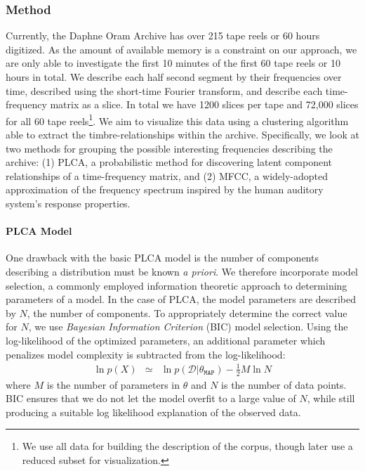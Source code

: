 \documentclass[a4paper,10pt,final]{ThesisStyle}
\begin{document}
\subsubsection{Method}

Currently, the Daphne Oram Archive has over 215 tape reels or 60 hours digitized.  As the amount of available memory is a constraint on our approach, we are only able to investigate the first 10 minutes of the first 60 tape reels or 10 hours in total.  We describe each half second segment by their frequencies over time, described using the short-time Fourier transform, and describe each time-frequency matrix as a slice.  In total we have 1200 slices per tape and 72,000 slices for all 60 tape reels\footnote{We use all data for building the description of the corpus, though later use a reduced subset for visualization.}.  We aim to visualize this data using a clustering algorithm able to extract the timbre-relationships within the archive.  Specifically, we look at two methods for grouping the possible interesting frequencies describing the archive: (1) PLCA, a probabilistic method for discovering latent component relationships of a time-frequency matrix, and (2) MFCC, a widely-adopted approximation of the frequency spectrum inspired by the human auditory system's response properties.

\paragraph{PLCA Model}
One drawback with the basic PLCA model is the number of components describing a distribution must be known \textit{a priori}.  We therefore incorporate model selection, a commonly employed information theoretic approach to determining parameters of a model.  In the case of PLCA, the model parameters are described by $N$, the number of components.  To appropriately determine the correct value for $N$, we use \textit{Bayesian Information Criterion} (BIC) model selection.  Using the log-likelihood of the optimized parameters, an additional parameter which penalizes model complexity is subtracted from the log-likelihood:
\begin{eqnarray}
\ln{p(X)} &\simeq& \ln{p(\mathcal{D}|\theta_{\mathtt{MAP}})} - \frac{1}{2}M\ln{N}
\end{eqnarray}
where $M$ is the number of parameters in $\theta$ and $N$ is the number of data points.  BIC ensures that we do not let the model overfit to a large value of $N$, while still producing a suitable log likelihood explanation of the observed data.
\end{document}

